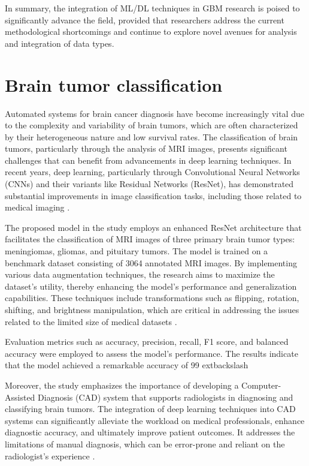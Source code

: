 \documentclass[runningheads]{llncs}
\begin{document}
In summary, the integration of ML/DL techniques in GBM research is poised to significantly advance the field, provided that researchers address the current methodological shortcomings and continue to explore novel avenues for analysis and integration of data types.
\section{Brain tumor classification}
Automated systems for brain cancer diagnosis have become increasingly vital due to the complexity and variability of brain tumors, which are often characterized by their heterogeneous nature and low survival rates. The classification of brain tumors, particularly through the analysis of MRI images, presents significant challenges that can benefit from advancements in deep learning techniques. In recent years, deep learning, particularly through Convolutional Neural Networks (CNNs) and their variants like Residual Networks (ResNet), has demonstrated substantial improvements in image classification tasks, including those related to medical imaging 	\cite{Sarah_2020}.

The proposed model in the study employs an enhanced ResNet architecture that facilitates the classification of MRI images of three primary brain tumor types: meningiomas, gliomas, and pituitary tumors. The model is trained on a benchmark dataset consisting of 3064 annotated MRI images. By implementing various data augmentation techniques, the research aims to maximize the dataset's utility, thereby enhancing the model's performance and generalization capabilities. These techniques include transformations such as flipping, rotation, shifting, and brightness manipulation, which are critical in addressing the issues related to the limited size of medical datasets 	\cite{Sarah_2020}.

Evaluation metrics such as accuracy, precision, recall, F1 score, and balanced accuracy were employed to assess the model's performance. The results indicate that the model achieved a remarkable accuracy of 99	extbackslash{}%

Moreover, the study emphasizes the importance of developing a Computer-Assisted Diagnosis (CAD) system that supports radiologists in diagnosing and classifying brain tumors. The integration of deep learning techniques into CAD systems can significantly alleviate the workload on medical professionals, enhance diagnostic accuracy, and ultimately improve patient outcomes. It addresses the limitations of manual diagnosis, which can be error-prone and reliant on the radiologist's experience 	\cite{Sarah_2020}.
\end{document}

